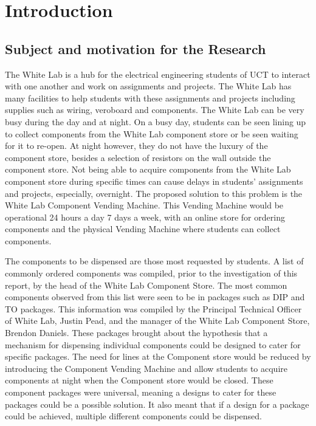 \documentclass[a4paper,11pt]{article}
\numberwithin{figure}{section}
\numberwithin{table}{section}
\begin{document}
\pagestyle{mypage}
\section{Introduction}\thispagestyle{sectionstart}
	\subsection{Subject and motivation for the Research}
The White Lab is a hub for the electrical engineering students of UCT to interact with one another and work on assignments and projects. The White Lab has many facilities to help students with these assignments and projects including supplies such as wiring, veroboard and components. The White Lab can be very busy during the day and at night. On a busy day, students can be seen lining up to collect components from the White Lab component store or be seen waiting for it to re-open. At night however, they do not have the luxury of the component store, besides a selection of resistors on the wall outside the component store. Not being able to acquire components from the White Lab component store during specific times can cause delays in students' assignments and projects, especially, overnight. The proposed solution to this problem is the White Lab Component Vending Machine. This Vending Machine would be operational 24 hours a day 7 days a week, with an online store for ordering components and the physical Vending Machine where students can collect components. 

The components to be dispensed are those most requested by students. A list of commonly ordered components was compiled, prior to the investigation of this report, by the head of the White Lab Component Store. The most common components observed from this list were seen to be in packages such as DIP and TO packages. This information was compiled by the Principal Technical Officer of White Lab, Justin Pead, and the manager of the White Lab Component Store, Brendon Daniels. These packages brought about the hypothesis that a mechanism for dispensing individual components could be designed to cater for specific packages. The need for lines at the Component store would be reduced by introducing the Component Vending Machine and allow students to acquire components at night when the Component store would be closed. These component packages were universal, meaning a designs to cater for these packages could be a possible solution. It also meant that if a design for a package could be achieved, multiple different components could be dispensed.
\end{document}
